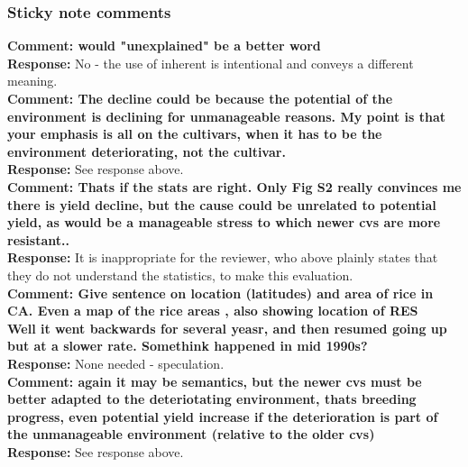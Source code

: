 \documentclass{article} \usepackage[margin=1in]{geometry}
\begin{document}
\subsubsection{Sticky note comments}

\textbf{Comment: would "unexplained" be a better word}\\

\textbf{Response:} No - the use of inherent is intentional and conveys
a different meaning.\\

\textbf{Comment: The decline could be because the potential of the
  environment is declining for unmanageable reasons. My point is that
  your emphasis is all on the cultivars, when it has to be the
  environment deteriorating, not the cultivar. }\\

\textbf{Response: } See response above.\\

\textbf{Comment: Thats if the stats are right. Only Fig S2 really
  convinces me there is yield decline, but the cause could be
  unrelated to potential yield, as would be a manageable stress to
  which newer cvs are more resistant..}\\

\textbf{Response: } It is inappropriate for the reviewer, who above plainly
states that they do not understand the statistics, to make this
evaluation.\\

\textbf{Comment: Give sentence on location (latitudes) and area of rice in
  CA. Even a map of the rice areas , also showing location of RES}\\

\textbf{Well it went backwards for several yeasr, and then resumed
  going up but at a slower rate. Somethink happened in mid 1990s?}\\

\textbf{Response: } None needed - speculation.\\

\textbf{Comment: again it may be semantics, but the newer cvs must be
  better adapted to the deteriotating environment, thats breeding
  progress, even potential yield increase if the deterioration is part
  of the unmanageable environment (relative to the older cvs)}\\

\textbf{Response: } See response above.\\
\end{document}
